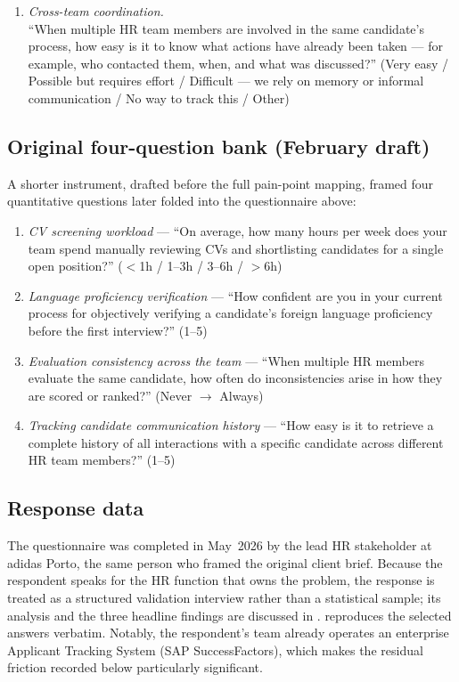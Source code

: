 \begin{enumerate}
	\item \textit{Cross-team coordination.}\\
	``When multiple HR team members are involved in the same candidate's
	process, how easy is it to know what actions have already been taken ---
	for example, who contacted them, when, and what was discussed?''
	(Very easy / Possible but requires effort / Difficult --- we rely on memory
	or informal communication / No way to track this / Other)
\end{enumerate}

\subsection*{Original four-question bank (February draft)}

A shorter instrument, drafted before the full pain-point mapping, framed four
quantitative questions later folded into the questionnaire above:

\begin{enumerate}
	\item \textit{CV screening workload} --- ``On average, how many hours per
	week does your team spend manually reviewing CVs and shortlisting
	candidates for a single open position?'' ($<$1h / 1--3h / 3--6h / $>$6h)
	\item \textit{Language proficiency verification} --- ``How confident are
	you in your current process for objectively verifying a candidate's foreign
	language proficiency before the first interview?'' (1--5)
	\item \textit{Evaluation consistency across the team} --- ``When multiple
	HR members evaluate the same candidate, how often do inconsistencies arise
	in how they are scored or ranked?'' (Never $\to$ Always)
	\item \textit{Tracking candidate communication history} --- ``How easy is
	it to retrieve a complete history of all interactions with a specific
	candidate across different HR team members?'' (1--5)
\end{enumerate}

\subsection*{Response data}

The questionnaire was completed in May~2026 by the lead HR stakeholder at
adidas Porto, the same person who framed the original client brief. Because
the respondent speaks for the HR function that owns the problem, the response
is treated as a structured validation interview rather than a statistical
sample; its analysis and the three headline findings are discussed in
.  reproduces the
selected answers verbatim. Notably, the respondent's team already operates an
enterprise Applicant Tracking System (SAP SuccessFactors), which makes the
residual friction recorded below particularly significant.

